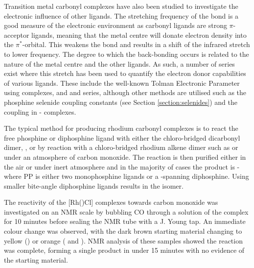 
Transition metal carbonyl complexes have also been studied to investigate the electronic influence of other ligands.  The stretching frequency of the  bond is a good measure of the electronic environment as carbonyl ligands are strong $\pi$-acceptor ligands, meaning that the metal centre will donate electron density into the $\pi^*$-orbital.  This weakens the  bond and results in a shift of the infrared  stretch to lower frequency.  The degree to which the back-bonding occurs is related to the nature of the metal centre and the other ligands.  As such, a number of series exist where this stretch has been used to quantify the electron donor capabilities of various ligands.  These include the well-known Tolman Electronic Parameter using \ce{[Ni(CO)3L]} complexes,\cite{Tolman1977, Tolman1970} and \ce{[Mo(CO)5L]} and \ce{[Rh(CO)ClL2]} series,\cite{Banger2009}  although other methods are utilised such as the phosphine selenide coupling constants (see Section \ref{section:selenides}) and the \JPtP{} coupling in \cis-\ce{[PtCl2P2]} complexes.\cite{Pregosin2012}

The typical method for producing rhodium carbonyl complexes is to react the free phosphine or diphosphine ligand with either the chloro-bridged dicarbonyl dimer, , or by reaction with a chloro-bridged rhodium alkene dimer such as  or  under an atmosphere of carbon monoxide.  The reaction is then purified either in the air or under inert atmosphere and in the majority of cases the product is \trans-\ce{[Rh(CO)(PP)Cl]} where PP is either two monophosphine ligands or a \trans-spanning diphosphine.  Using smaller bite-angle diphosphine ligands results in the \cis{} isomer.  

The reactivity of the [Rh(\tBuxantphosk)Cl] complexes towards carbon monoxide was investigated on an NMR scale by bubbling CO through a  solution of the complex for 10 minutes before sealing the NMR tube with a J. Young tap.  An immediate colour change was observed, with the dark brown starting material changing to yellow (\tBusixantphos) or orange (\tButhixantphos{} and \tBuxantphos).  NMR analysis of these samples showed the reaction was complete, forming a single product in under 15 minutes with no evidence of the starting material.

